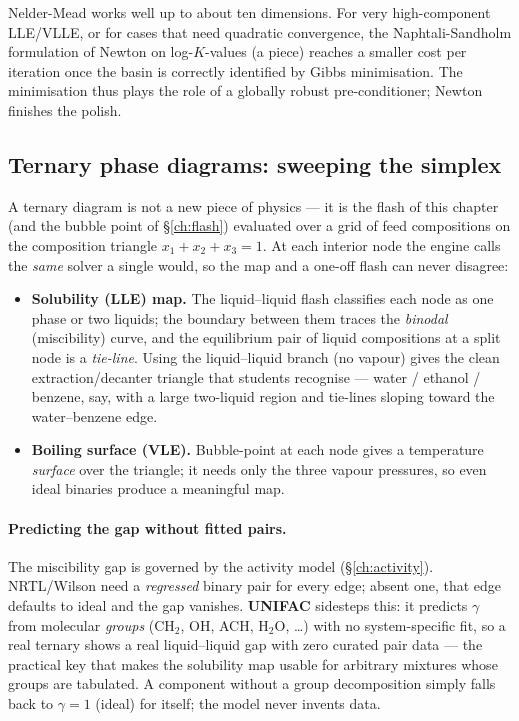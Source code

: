\documentclass[11pt,a4paper]{article}
\begin{document}
Nelder-Mead works well up to about ten dimensions.  For very
high-component LLE/VLLE, or for cases that need quadratic
convergence, the Naphtali-Sandholm formulation of Newton on
log-$K$-values (a piece) reaches a smaller cost per
iteration once the basin is correctly identified by Gibbs
minimisation.  The minimisation thus plays the role of a globally
robust pre-conditioner; Newton finishes the polish.

\subsection{Ternary phase diagrams: sweeping the simplex}\label{sec:ternary}

A ternary diagram is not a new piece of physics --- it is the flash of this
chapter (and the bubble point of \S\ref{ch:flash}) evaluated over a grid of
feed compositions on the composition triangle $x_1+x_2+x_3=1$. At each interior
node the engine calls the \emph{same} solver a single 
would, so the map and a one-off flash can never disagree:
\begin{itemize}[leftmargin=*]
  \item \textbf{Solubility (LLE) map.} The liquid--liquid flash classifies each
        node as one phase or two liquids; the boundary between them traces the
        \emph{binodal} (miscibility) curve, and the equilibrium pair of liquid
        compositions at a split node is a \emph{tie-line}. Using the
        liquid--liquid branch (no vapour) gives the clean
        extraction/decanter triangle that students recognise --- water /
        ethanol / benzene, say, with a large two-liquid region and tie-lines
        sloping toward the water--benzene edge.
  \item \textbf{Boiling surface (VLE).} Bubble-point at each node gives a
        temperature \emph{surface} over the triangle; it needs only the three
        vapour pressures, so even ideal binaries produce a meaningful map.
\end{itemize}

\paragraph{Predicting the gap without fitted pairs.} The miscibility gap is
governed by the activity model (\S\ref{ch:activity}). NRTL/Wilson need a
\emph{regressed} binary pair for every edge; absent one, that edge defaults to
ideal and the gap vanishes. \textbf{UNIFAC} sidesteps this: it predicts $\gamma$
from molecular \emph{groups} (CH$_2$, OH, ACH, H$_2$O, \dots) with no
system-specific fit, so a real ternary shows a real liquid--liquid gap with
zero curated pair data --- the practical key that makes the solubility map
usable for arbitrary mixtures whose groups are tabulated. A component without a
group decomposition simply falls back to $\gamma=1$ (ideal) for itself; the
model never invents data.
\end{document}
